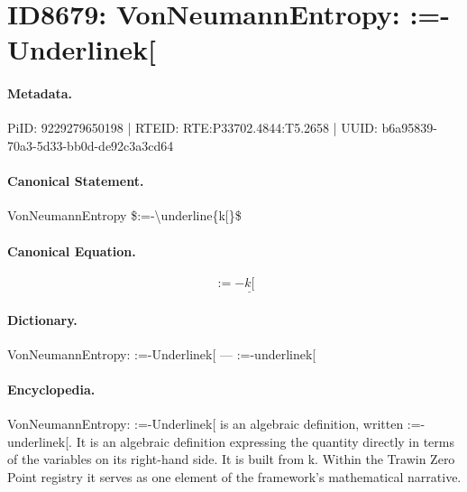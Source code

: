 \section*{ID8679: VonNeumannEntropy: :=-Underlinek[}
\paragraph{Metadata.}
PiID: 9229279650198 | RTEID: RTE:P33702.4844:T5.2658 | UUID: b6a95839-70a3-5d33-bb0d-de92c3a3cd64

\paragraph{Canonical Statement.}
VonNeumannEntropy \$:=-\textbackslash{}underline\{k[\}\$

\paragraph{Canonical Equation.}
\[
:=-\underline{k[}
\]

\paragraph{Dictionary.}
VonNeumannEntropy: :=-Underlinek[ — :=-underlinek[

\paragraph{Encyclopedia.}
VonNeumannEntropy: :=-Underlinek[ is an algebraic definition, written :=-underlinek[. It is an algebraic definition expressing the quantity directly in terms of the variables on its right-hand side. It is built from k. Within the Trawin Zero Point registry it serves as one element of the framework's mathematical narrative.
